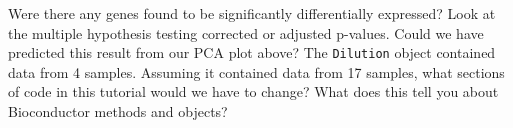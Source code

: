 \documentclass[12pt]{article}
\newcommand{\code}[1]{{\texttt{#1}}}
\begin{document}
Were there any genes found to be significantly differentially expressed?  Look at the multiple hypothesis testing corrected or adjusted p-values.  Could we have predicted this result from our PCA plot above?  The \code{Dilution} object contained data from 4 samples.  Assuming it contained data from 17 samples, what sections of code in this tutorial would we have to change?  What does this tell you about Bioconductor methods and objects?      
\end{document}
